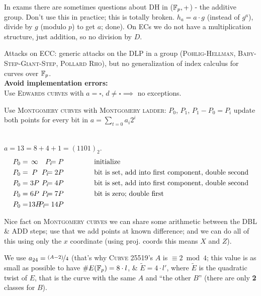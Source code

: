 \begin{remark}
In exams there are sometimes questions about \textsc{DH} in ($\mathbb{F}_p, +$) - the additive group. Don't use this in practice; this is totally broken. $h_a = a \cdot g$ (instead of $g^a$), divide by $g$ (modulo $p$) to get $a$; done). On \textsc{EC}s we do not have a multiplication structure, just addition, so no division by $D$.
\end{remark}

Attacks on \textsc{ECC}: generic attacks on the \textsc{DLP} in a group (\textsc{Pohlig-Hellman}, \textsc{Baby-Step-Giant-Step}, \textsc{Pollard Rho}), but no generalization of index calculus for curves over $\mathbb{F}_p$. \\

\textbf{Avoid implementation errors:}\\

Use \textsc{Edwards curves} with $a = \square$, $d \neq \square \implies $ no exceptions.

Use \textsc{Montgomery curves} with \textsc{Montgomery ladder}: $P_0$, $P_1$, $P_1-P_0 = P_i$ update both points for every bit in $a=\sum\limits_{t=0} a_i2^i$ 

\begin{example}\ \\
$a=13 = 8 + 4 +1=(1101)_2$.
\begin{align*}
&P_0 = \,\,\,\, \tikzmark{infty}{\infty} &\tikzmark{P_i_1}{P_i} = P \qquad \qquad &\text{ initialize} \\
&P_0 = \,\,\,\, \tikzmark{P}{P} &\tikzmark{P_i_2}{P_i} = 2P \qquad \qquad &\text{ bit is set, add into first component, double second} \\
&P_0 = \,\,\,\, \tikzmark{3P}{3P} &\tikzmark{P_i_3}{P_i} = 4P \qquad \qquad &\text{ bit is set, add into first component, double second} \\
&P_0 = \,\,\,\, \tikzmark{6P}{6P} &\tikzmark{P_i_4}{P_i} = 7P \qquad \qquad &\text{ bit is zero; double first}\\
&P_0 = \,\,\,\, \tikzmark{13P}{13P} &\tikzmark{P_i_5}{P_i} = 14P \qquad \qquad & \text{}
\end{align*}
\end{example}

Nice fact on \textsc{Montgomery curves} we can share some arithmetic between the DBL \& ADD steps; use that we add points at known difference; and we can do all of this using only the $x$ coordinate (using proj. coords this means $X$ and $Z$).

We use $a_{24} = \nicefrac{(A-2)}{4}$ (that's why \textsc{Curve 25519}'s $A$ is $\equiv 2 \bmod 4$; this value is as small as possible to have $\# E(\mathbb{F}_p) = 8 \cdot l$, \& $\tilde{E} = 4 \cdot l'$, where $\tilde{E}$ is the quadratic twist of $E$, that is the curve  with the same $A$ and ``the other $B$'' (there are only \textbf{2} classes for $B$).

